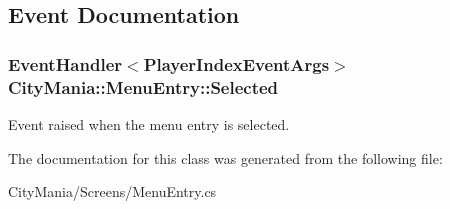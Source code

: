 \subsection{Event Documentation}
\hypertarget{classCityMania_1_1MenuEntry_a936e132fbdf1e2e598b82ef1b022f96c}{
\subsubsection[{Selected}]{\setlength{\rightskip}{0pt plus 5cm}EventHandler$<${\bf PlayerIndexEventArgs}$>$ CityMania::MenuEntry::Selected}}
\label{classCityMania_1_1MenuEntry_a936e132fbdf1e2e598b82ef1b022f96c}


Event raised when the menu entry is selected. 

The documentation for this class was generated from the following file:\begin{DoxyCompactItemize}
\item 
CityMania/Screens/MenuEntry.cs\end{DoxyCompactItemize}
